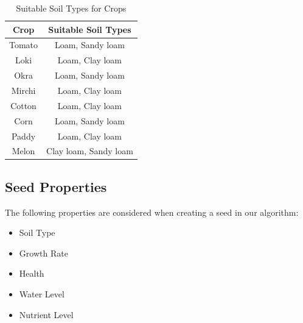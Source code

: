 \documentclass[conference]{IEEEtran}
\begin{document}
\begin{table}[h]
  \centering
  \begin{tabular}{|c|c|}
    \hline
    \textbf{Crop} & \textbf{Suitable Soil Types} \\
    \hline
    Tomato & Loam, Sandy loam \\
    Loki & Loam, Clay loam \\
    Okra & Loam, Sandy loam \\
    Mirchi & Loam, Clay loam \\
    Cotton & Loam, Clay loam \\
    Corn & Loam, Sandy loam \\
    Paddy & Loam, Clay loam \\
    Melon & Clay loam, Sandy loam \\
    \hline
  \end{tabular}
  \caption{Suitable Soil Types for Crops}
\end{table}


\subsection{Seed Properties}

The following properties are considered when creating a seed in our algorithm:

\begin{itemize}
  \item Soil Type
  \item Growth Rate
  \item Health
  \item Water Level
  \item Nutrient Level
\end{itemize}
\end{document}
